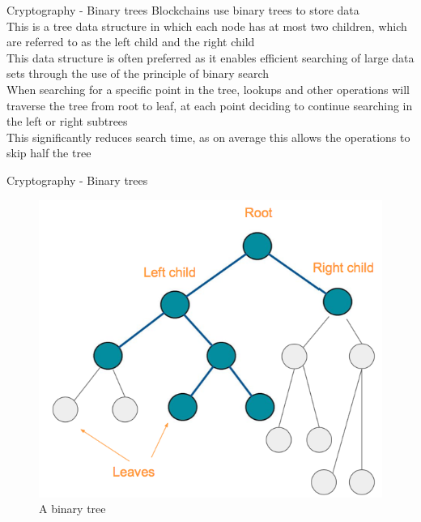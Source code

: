 \documentclass[9pt]{beamer}
\begin{document}
\begin{frame}{Cryptography - Binary trees}
	Blockchains use binary trees to store data \\ \vspace{3mm}
	This is a tree data structure in which each node has at most two children, which are referred to as the left child and the right child \\ \vspace{3mm}
	This data structure is often preferred as it enables efficient searching of large data sets through the use of the principle of binary search \\ \vspace{3mm}
	When searching for a specific point in the tree, lookups and other operations will traverse the tree from root to leaf, at each point deciding to continue searching in the left or right subtrees \\ \vspace{3mm}
	This significantly reduces search time, as on average this allows the operations to skip half the tree
\end{frame}


\begin{frame}{Cryptography - Binary trees}
	\begin{figure}[]
		\centering
		\includegraphics  [scale=0.3]{Images/binary}
		\caption{A binary tree}
	\end{figure}
\end{frame}
\end{document}

